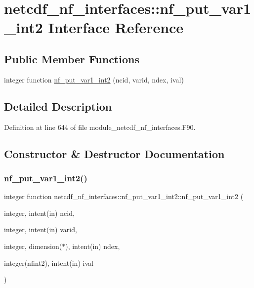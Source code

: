 \hypertarget{interfacenetcdf__nf__interfaces_1_1nf__put__var1__int2}{}\section{netcdf\+\_\+nf\+\_\+interfaces\+:\+:nf\+\_\+put\+\_\+var1\+\_\+int2 Interface Reference}
\label{interfacenetcdf__nf__interfaces_1_1nf__put__var1__int2}
\subsection*{Public Member Functions}
\begin{DoxyCompactItemize}
\item 
integer function \hyperlink{interfacenetcdf__nf__interfaces_1_1nf__put__var1__int2_a413f43c9a4521b9430c2dd2de52555a8}{nf\+\_\+put\+\_\+var1\+\_\+int2} (ncid, varid, ndex, ival)
\end{DoxyCompactItemize}


\subsection{Detailed Description}


Definition at line 644 of file module\+\_\+netcdf\+\_\+nf\+\_\+interfaces.\+F90.



\subsection{Constructor \& Destructor Documentation}
\mbox{\label{interfacenetcdf__nf__interfaces_1_1nf__put__var1__int2_a413f43c9a4521b9430c2dd2de52555a8}} 
\subsubsection{\texorpdfstring{nf\+\_\+put\+\_\+var1\+\_\+int2()}{nf\_put\_var1\_int2()}}
{\footnotesize\ttfamily integer function netcdf\+\_\+nf\+\_\+interfaces\+::nf\+\_\+put\+\_\+var1\+\_\+int2\+::nf\+\_\+put\+\_\+var1\+\_\+int2 (\begin{DoxyParamCaption}\item[{integer, intent(in)}]{ncid,  }\item[{integer, intent(in)}]{varid,  }\item[{integer, dimension($\ast$), intent(in)}]{ndex,  }\item[{integer(nfint2), intent(in)}]{ival }\end{DoxyParamCaption})}




